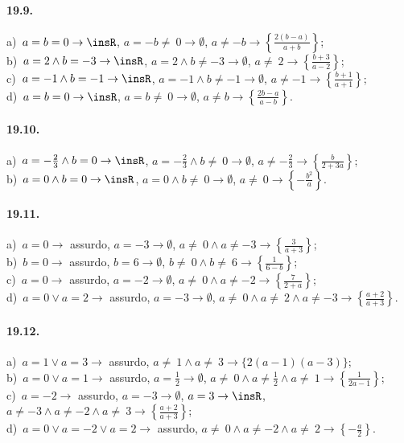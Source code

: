 \paragraph{19.9.}
a)~$a=b=0 \rightarrow \insR$, $a=-b\neq~0 \rightarrow \emptyset$, $a\neq -b \rightarrow \left\{\frac{2(b-a)}{a+b}\right\}$;
\protect\\ b)~$a=2\wedge b=-3 \rightarrow \insR$, $a=2\wedge b\neq -3 \rightarrow \emptyset$, $a\neq~2 \rightarrow \left\{\frac{b+3}{a-2}\right\}$;
\protect\\ c)~$a=-1\wedge b=-1 \rightarrow \insR$, $a=-1\wedge b\neq -1 \rightarrow \emptyset$, $a\neq -1 \rightarrow \left\{\frac{b+1}{a+1}\right\}$;
\protect\\ d)~$a=b=0 \rightarrow \insR$, $a=b\neq~0 \rightarrow \emptyset$, $a\neq b \rightarrow \left\{\frac{2b-a}{a-b}\right\}$.

\paragraph{19.10.}
a)~$a=-{\frac{2}{3}}\wedge b=0 \rightarrow \insR$, $a=-{\frac{2}{3}}\wedge b\neq~0 \rightarrow \emptyset$, $a\neq -{\frac{2}{3}} \rightarrow \left\{\frac{b}{2+3a}\right\}$;
\protect\\ b)~$a=0\wedge b=0 \rightarrow \insR$, $a=0\wedge b\neq~0 \rightarrow \emptyset$, $a\neq~0 \rightarrow \left\{-{\frac{b^{2}}{a}}\right\}$.

\paragraph{19.11.}
a)~$a=0 \rightarrow$ assurdo, $a=-3 \rightarrow \emptyset$, $a\neq~0\wedge a\neq -3 \rightarrow \left\{\frac{3}{a+3}\right\}$;
\protect\\ b)~$b=0 \rightarrow$ assurdo, $b=6 \rightarrow \emptyset$, $b\neq~0\wedge b\neq~6 \rightarrow \left\{\frac{1}{6-b}\right\}$;
\protect\\ c)~$a=0 \rightarrow$ assurdo, $a=-2 \rightarrow \emptyset$, $a\neq~0\wedge a\neq -2 \rightarrow \left\{\frac{7}{2+a}\right\}$;
\protect\\ d)~$a=0\vee a=2 \rightarrow$ assurdo, $a=-3 \rightarrow \emptyset$, $a\neq~0\wedge a\neq~2\wedge a\neq -3 \rightarrow \left\{\frac{a+2}{a+3}\right\}$.

\paragraph{19.12.}
a)~$a=1\vee a=3 \rightarrow$ assurdo, $a\neq~1\wedge a\neq~3 \rightarrow \{2(a-1)(a-3)\}$;
\protect\\ b)~$a=0\vee a=1 \rightarrow$ assurdo, $a=\frac{1}{2} \rightarrow \emptyset$, $a\neq~0\wedge a\neq \frac{1}{2}\wedge a\neq~1 \rightarrow \left\{\frac{1}{2a-1}\right\}$;
\protect\\ c)~$a=-2 \rightarrow$ assurdo, $a=-3 \rightarrow \emptyset$, $a=3 \rightarrow \insR$, $a\neq -3\wedge a\neq -2\wedge a\neq~3 \rightarrow \left\{\frac{a+2}{a+3}\right\}$;
\protect\\ d)~$a=0\vee a=-2\vee a=2 \rightarrow$ assurdo, $a\neq~0\wedge a\neq -2\wedge a\neq~2 \rightarrow \left\{-{\frac{a}{2}}\right\}$.

